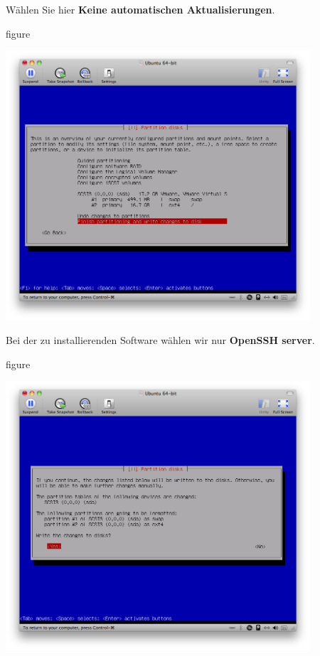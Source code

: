 Wählen Sie hier \textbf{Keine automatischen Aktualisierungen}.

\begin{nofloat}{figure}
\begin{center}
\includegraphics[width=0.85\textwidth]{screenshots/26_ubuntu_install.png}
\end{center}
\end{nofloat}

\pagebreak
Bei der zu installierenden Software wählen wir nur \textbf{OpenSSH server}.

\begin{nofloat}{figure}
\begin{center}
\includegraphics[width=0.85\textwidth]{screenshots/27_ubuntu_install.png}
\end{center}
\end{nofloat}

